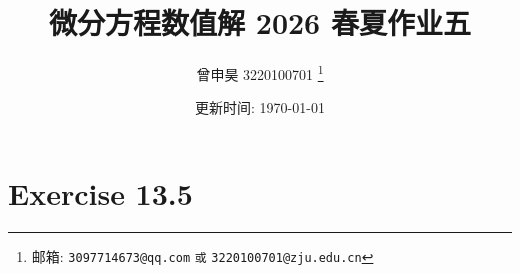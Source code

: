\documentclass[a4paper]{article}
\begin{document}
\title{微分方程数值解 2026 春夏作业五}

\author{曾申昊 3220100701
  \thanks{邮箱: \texttt{3097714673@qq.com}
                            \texttt{或} \texttt{3220100701@zju.edu.cn}}}

\date{更新时间: \today}

\maketitle

\section*{Exercise 13.5}
\end{document}
